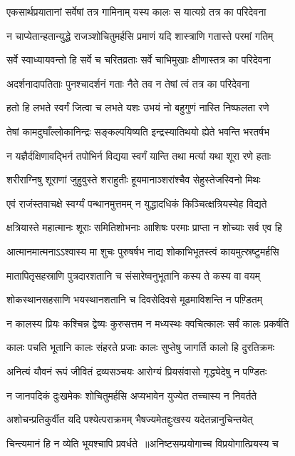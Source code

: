 \twolineshloka
{एकसार्थप्रयातानां सर्वेषां तत्र गामिनाम्}
{यस्य कालः स यात्यग्रे तत्र का परिदेवना}


\twolineshloka
{न चाप्येतान्हतान्युद्धे राजञ्शोचितुमर्हसि}
{प्रमाणं यदि शास्त्राणि गतास्ते परमां गतिम्}


\twolineshloka
{सर्वे स्वाध्यायवन्तो हि सर्वे च चरितव्रताः}
{सर्वे चाभिमुखाः क्षीणास्तत्र का परिदेवना}


\twolineshloka
{अदर्शनादापतिताः पुनश्चादर्शनं गताः}
{नैते तव न तेषां त्वं तत्र का परिदेवना}


\twolineshloka
{हतो हि लभते स्वर्गं जित्वा च लभते यशः}
{उभयं नो बहुगुणं नास्ति निष्फलता रणे}


\twolineshloka
{तेषां कामदुघाँल्लोकानिन्द्रः सङ्कल्पयिष्यति}
{इन्द्रस्यातिथयो ह्येते भवन्ति भरतर्षभ}


\twolineshloka
{न यज्ञैर्दक्षिणावद्भिर्न तपोभिर्न विद्यया}
{स्वर्गं यान्ति तथा मर्त्या यथा शूरा रणे हताः}


\twolineshloka
{शरीराग्निषु शूराणां जुहुवुस्ते शराहुतीः}
{हूयमानाञ्शरांश्चैव सेहुस्तेजस्विनो मिथः}


\twolineshloka
{एवं राजंस्तवाचक्षे स्वर्ग्यं पन्थानमुत्तमम्}
{न युद्धादधिकं किञ्चित्क्षत्रियस्येह विद्यते}


\twolineshloka
{क्षत्रियास्ते महात्मानः शूराः समितिशोभनाः}
{आशिषः परमाः प्राप्ता न शोच्याः सर्व एव हि}


\twolineshloka
{आत्मानमात्मनाऽऽश्वास्य मा शुचः पुरुषर्षभ}
{नाद्य शोकाभिभूतस्त्वं कायमुत्स्रष्टुमर्हसि}


\twolineshloka
{मातापितृसहस्राणि पुत्रदारशतानि च}
{संसारेष्वनुभूतानि कस्य ते कस्य वा वयम्}


\twolineshloka
{शोकस्थानसहसाणि भयस्थानशतानि च}
{दिवसेदिवसे मूढमाविशन्ति न पण़्डितम्}


\twolineshloka
{न कालस्य प्रियः कश्चिन्न द्वेष्यः कुरुसत्तम}
{न मध्यस्थः क्वचित्कालः सर्वं कालः प्रकर्षति}


\twolineshloka
{कालः पचति भूतानि कालः संहरते प्रजाः}
{कालः सुप्तेषु जागर्ति कालो हि दुरतिक्रमः}


\twolineshloka
{अनित्यं यौवनं रूपं जीवितं द्रव्यसञ्चयः}
{आरोग्यं प्रियसंवासो गृद्ध्येदेषु न पण्डितः}


\twolineshloka
{न जानपदिकं दुःखमेकः शोचितुमर्हसि}
{अप्यभावेन युज्येत तच्चास्य न निवर्तते}


\twolineshloka
{अशोचन्प्रतिकुर्वीत यदि पश्येत्पराक्रमम्}
{भैषज्यमेतद्दुःखस्य यदेतन्नानुचिन्तयेत्}


\twolineshloka
{चिन्त्यमानं हि न व्येति भूयश्चापि प्रवर्धते ॥अनिष्टसम्प्रयोगाच्च विप्रयोगात्प्रियस्य च}
{}


